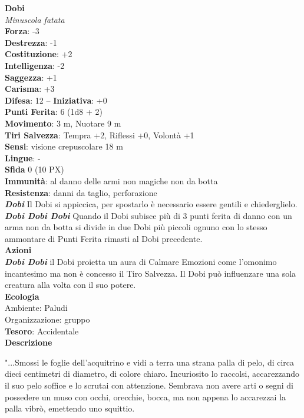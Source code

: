 \begin{multicols}{2}
\medskip\textbf{Dobi}\\
\textit{Minuscola fatata}\\
\textbf{Forza}: -3\\
\textbf{Destrezza}: -1\\
\textbf{Costituzione}: +2\\
\textbf{Intelligenza}: -2\\
\textbf{Saggezza}: +1\\
\textbf{Carisma}: +3\\
\textbf{Difesa}: 12 -- \textbf{Iniziativa}: +0\\
\textbf{Punti Ferita}: 6 (1d8 + 2)\\
\textbf{Movimento}: 3 m, Nuotare 9 m\\
\textbf{Tiri Salvezza}: Tempra +2, Riflessi +0, Volontà +1 \\
\textbf{Sensi}: visione crepuscolare 18 m \\
\textbf{Lingue}: - \\
\textbf{Sfida} 0 (10 PX)\\
\textbf{Immunità}: al danno delle armi non magiche non da botta\\
\textbf{Resistenza}: danni da taglio, perforazione\\
\textit{\textbf{Dobi}} Il Dobi si appiccica, per spostarlo è necessario essere gentili e chiederglielo.\\
\textit{\textbf{Dobi Dobi Dobi}} Quando il Dobi subisce più di 3 punti ferita di danno con un arma non da botta si divide in due Dobi più piccoli ognuno con lo stesso ammontare di Punti Ferita rimasti al Dobi precedente.\\
\smallskip\textbf{Azioni}\\
\textit{\textbf{Dobi Dobi}} il Dobi proietta un aura di Calmare Emozioni come l'omonimo incantesimo ma non è concesso il Tiro Salvezza. Il Dobi può influenzare una sola creatura alla volta con il suo potere.\\
\textbf{Ecologia}\\
Ambiente: Paludi\\
Organizzazione: gruppo\\
\textbf{Tesoro}: Accidentale\\
\textbf{Descrizione}\\
{\small "...Smossi le foglie dell'acquitrino e vidi a terra una strana palla di pelo, di circa dieci centimetri di diametro, di colore chiaro. Incuriosito lo raccolsi, accarezzando il suo pelo soffice e lo scrutai con attenzione. Sembrava non avere arti o segni di possedere un muso con occhi, orecchie, bocca, ma non appena lo accarezzai la palla vibrò, emettendo uno squittio.

}
\end{multicols}
